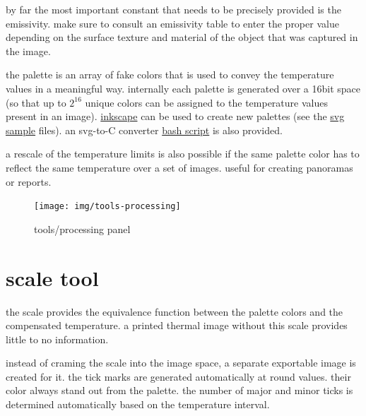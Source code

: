 \documentclass[12pt,twoside,a4paper,titlepage]{report}
\begin{document}
by far the most important constant that needs to be precisely provided is the emissivity. make sure to consult an emissivity table to enter the proper value depending on the surface texture and material of the object that was captured in the image.

the palette is an array of fake colors that is used to convey the temperature values in a meaningful way. internally each palette is generated over a 16bit space (so that up to $2^{16}$ unique colors can be assigned to the temperature values present in an image). \href{https://inkscape.org/}{inkscape} can be used to create new palettes (see the \href{https://github.com/rodan/thpp/blob/main/palette/hmetal2.svg}{svg sample} files). an svg-to-C converter \href{https://github.com/rodan/thpp/blob/main/palette/extract_pal.sh}{bash script} is also provided.

a rescale of the temperature limits is also possible if the same palette color has to reflect the same temperature over a set of images. useful for creating panoramas or reports.


\begin{figure}[ht]
 \centering
 \texttt{[image: img/tools-processing]}
 \caption{tools/processing panel}
 \label{fig:tools-processing}
\end{figure}

\section{scale tool} \label{sec:tools-scale}

the scale provides the equivalence function between the palette colors and the compensated temperature. a printed thermal image without this scale provides little to no information.

instead of craming the scale into the image space, a separate exportable image is created for it. the tick marks are generated automatically at round values. their color always stand out from the palette. the number of major and minor ticks is determined automatically based on the temperature interval.
\end{document}
